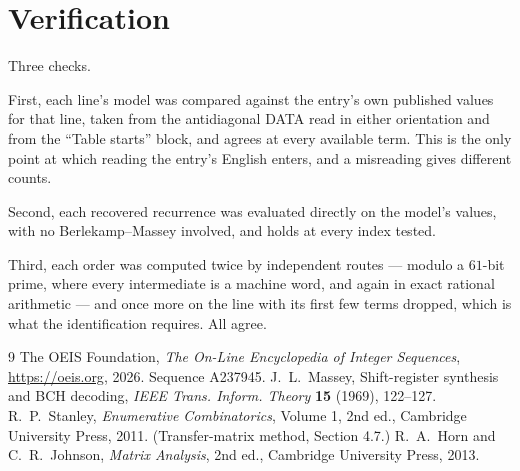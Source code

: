 \documentclass[11pt,a4paper]{article}
\theoremstyle{plain}
\theoremstyle{definition}
\begin{document}
\section{Verification}

Three checks.

First, each line's model was compared against the entry's own published values for that line,
taken from the antidiagonal DATA read in either orientation and from the ``Table starts''
block, and agrees at every available term. This is the only point at which reading the entry's
English enters, and a misreading gives different counts.

Second, each recovered recurrence was evaluated directly on the model's values, with no
Berlekamp--Massey involved, and holds at every index tested.

Third, each order was computed twice by independent routes --- modulo a $61$-bit prime, where
every intermediate is a machine word, and again in exact rational arithmetic --- and once more
on the line with its first few terms dropped, which is what the identification requires. All
agree.

\begin{thebibliography}{9}
 The OEIS Foundation, \emph{The On-Line Encyclopedia of Integer
Sequences}, \url{https://oeis.org}, 2026. Sequence A237945.
 J.~L.~Massey, Shift-register synthesis and BCH decoding, \emph{IEEE
Trans. Inform. Theory} \textbf{15} (1969), 122--127.
 R.~P.~Stanley, \emph{Enumerative Combinatorics}, Volume 1, 2nd ed.,
Cambridge University Press, 2011. (Transfer-matrix method, Section 4.7.)
 R.~A.~Horn and C.~R.~Johnson, \emph{Matrix Analysis}, 2nd ed., Cambridge
University Press, 2013.
\end{thebibliography}
\end{document}
